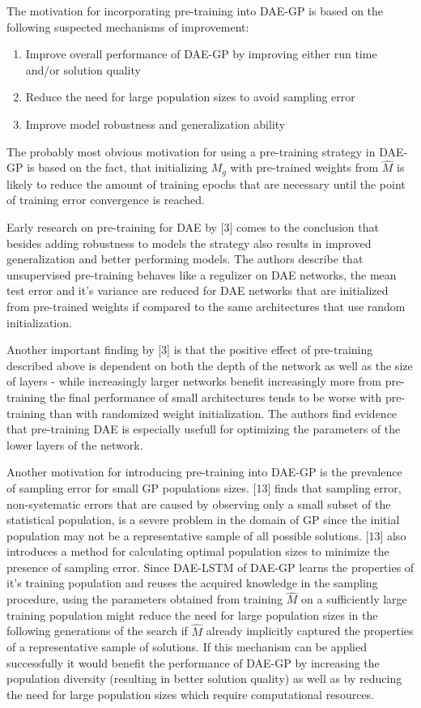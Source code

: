 \documentclass[
  11pt,
]{article}
\providecommand{\tightlist}{%
  \setlength{\itemsep}{0pt}\setlength{\parskip}{0pt}}
\begin{document}
The motivation for incorporating pre-training into DAE-GP is based on
the following suspected mechanisms of improvement:

\begin{enumerate}
\def\labelenumi{\arabic{enumi}.}
\tightlist
\item
  Improve overall performance of DAE-GP by improving either run time
  and/or solution quality
\item
  Reduce the need for large population sizes to avoid sampling error
\item
  Improve model robustness and generalization ability
\end{enumerate}

The probably most obvious motivation for using a pre-training strategy
in DAE-GP is based on the fact, that initializing \(M_g\) with
pre-trained weights from \(\hat{M}\) is likely to reduce the amount of
training epochs that are necessary until the point of training error
convergence is reached.

Early research on pre-training for DAE by {[}3{]} comes to the
conclusion that besides adding robustness to models the strategy also
results in improved generalization and better performing models. The
authors describe that unsupervised pre-training behaves like a regulizer
on DAE networks, the mean test error and it's variance are reduced for
DAE networks that are initialized from pre-trained weights if compared
to the same architectures that use random initialization.

Another important finding by {[}3{]} is that the positive effect of
pre-training described above is dependent on both the depth of the
network as well as the size of layers - while increasingly larger
networks benefit increasingly more from pre-training the final
performance of small architectures tends to be worse with pre-training
than with randomized weight initialization. The authors find evidence
that pre-training DAE is especially usefull for optimizing the
parameters of the lower layers of the network.

Another motivation for introducing pre-training into DAE-GP is the
prevalence of sampling error for small GP populations sizes. {[}13{]}
finds that sampling error, non-systematic errors that are caused by
observing only a small subset of the statistical population, is a severe
problem in the domain of GP since the initial population may not be a
representative sample of all possible solutions. {[}13{]} also
introduces a method for calculating optimal population sizes to minimize
the presence of sampling error. Since DAE-LSTM of DAE-GP learns the
properties of it's training population and reuses the acquired knowledge
in the sampling procedure, using the parameters obtained from training
\(\hat{M}\) on a sufficiently large training population might reduce the
need for large population sizes in the following generations of the
search if \(\hat{M}\) already implicitly captured the properties of a
representative sample of solutions. If this mechanism can be applied
successfully it would benefit the performance of DAE-GP by increasing
the population diversity (resulting in better solution quality) as well
as by reducing the need for large population sizes which require
computational resources.
\end{document}
